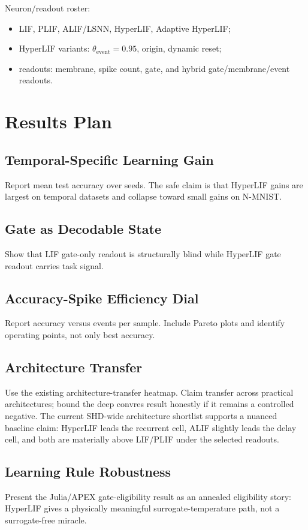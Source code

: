 \documentclass[journal]{IEEEtran}
\begin{document}
Neuron/readout roster:
\begin{itemize}
  \item LIF, PLIF, ALIF/LSNN, HyperLIF, Adaptive HyperLIF;
  \item HyperLIF variants: $\theta_{\mathrm{event}}=0.95$, origin, dynamic reset;
  \item readouts: membrane, spike count, gate, and hybrid gate/membrane/event readouts.
\end{itemize}

\section{Results Plan}
\subsection{Temporal-Specific Learning Gain}
Report mean test accuracy over seeds. The safe claim is that HyperLIF gains are largest on temporal datasets and collapse toward small gains on N-MNIST.

\subsection{Gate as Decodable State}
Show that LIF gate-only readout is structurally blind while HyperLIF gate readout carries task signal.

\subsection{Accuracy-Spike Efficiency Dial}
Report accuracy versus events per sample. Include Pareto plots and identify operating points, not only best accuracy.

\subsection{Architecture Transfer}
Use the existing architecture-transfer heatmap. Claim transfer across practical architectures; bound the deep convres result honestly if it remains a controlled negative. The current SHD-wide architecture shortlist supports a nuanced baseline claim: HyperLIF leads the recurrent cell, ALIF slightly leads the delay cell, and both are materially above LIF/PLIF under the selected readouts.

\subsection{Learning Rule Robustness}
Present the Julia/APEX gate-eligibility result as an annealed eligibility story: HyperLIF gives a physically meaningful surrogate-temperature path, not a surrogate-free miracle.
\end{document}
